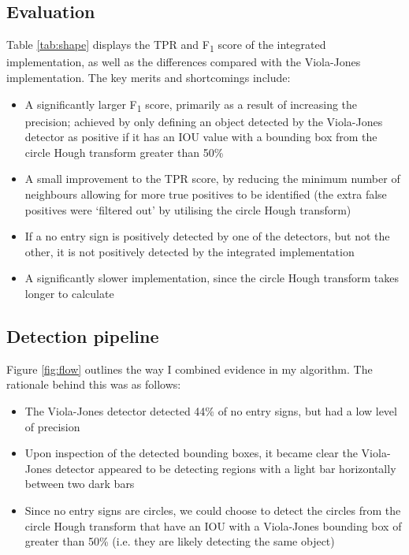 \documentclass[twocolumn, 10pt, a4paper]{article}
\begin{document}
\subsection{Evaluation}

Table \ref{tab:shape} displays the TPR and F\textsubscript{1} score of the integrated implementation, as well as the differences compared with the Viola-Jones implementation.
The key merits and shortcomings include:
\begin{itemize}
\itemsep 0em 
\item A significantly larger F\textsubscript{1} score, primarily as a result of increasing the precision; achieved by only defining an object detected by the Viola-Jones detector as positive if it has an IOU value with a  bounding box from the circle Hough transform greater than 50\%
\item A small improvement to the TPR score, by reducing the minimum  number of neighbours allowing for more true positives to be identified (the extra false positives were `filtered out' by utilising the circle Hough transform)
\item If a no entry sign is positively detected by one of the detectors, but not the other, it is not positively detected by the integrated implementation
\item A significantly slower implementation, since the circle Hough transform takes longer to calculate
\end{itemize}

\subsection{Detection pipeline}

Figure \ref{fig:flow} outlines the way I combined evidence in my algorithm.
The rationale behind this was as follows:
\begin{itemize}
\itemsep 0em 
\item The Viola-Jones detector detected 44\% of no entry signs, but had a low level of precision
\item Upon inspection of the detected bounding boxes, it became clear the Viola-Jones detector appeared to be detecting regions with a light bar horizontally between two dark bars
\item Since no entry signs are circles, we could choose to detect the circles from the circle Hough transform that have an IOU with a Viola-Jones bounding box of greater than 50\% (i.e. they are likely detecting the same object)
\end{itemize}
\end{document}
